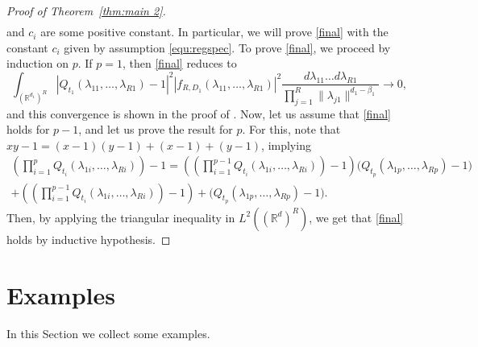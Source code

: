 \documentclass[12pt]{article}
\DeclareMathOperator{\1}{1}
\newcommand{\R}{\mathbb{R}}
\theoremstyle{plain}
\theoremstyle{definition}
\begin{document}
\begin{proof}[Proof of Theorem~\ref{thm:main 2}]
\begin{eqnarray*}
 \end{eqnarray*}
 and $c_i$ are some positive constant.
 In particular, we will prove \eqref{final} with the constant $c_i$ given by assumption \eqref{equ:regspec}.
 To prove \eqref{final}, we proceed by induction on $p$. If $p=1$, then  \eqref{final} reduces to
 \[
\int_{(\R^{d_1})^R}\left|Q_{t_1}(\lambda_{11},\dots,\lambda_{R1})-1\right|^2\left|f_{R,D_1}(\lambda_{11},\dots,\lambda_{R1})\right|^2 \frac{d\lambda_{11}\dots d\lambda_{R1}}{\prod_{j=1}^R\|\lambda_{j1}\|^{d_1-\beta_1}}\rightarrow 0,
 \]
and this convergence is shown in the proof of \cite[Theorem 5]{LO14}. Now, let us assume that \eqref{final} holds for $p-1$, and let us prove the result for $p$. For this, note that $xy-1=(x-1)(y-1)+(x-1)+(y-1)$, implying
\begin{multline}
    \left(\prod_{i=1}^p Q_{t_i}(\lambda_{1i},\dots,\lambda_{Ri})\right)-1
    = \left(\left(\prod_{i=1}^{p-1} Q_{t_i}(\lambda_{1i},\dots,\lambda_{Ri})\right)-1\right)\Bigg(Q_{t_p}(\lambda_{1p},\dots,\lambda_{Rp})-1\Bigg)\\
 +\left(\left(\prod_{i=1}^{p-1} Q_{t_i}(\lambda_{1i},\dots,\lambda_{Ri})\right)-1\right)+\Bigg(Q_{t_p}(\lambda_{1p},\dots,\lambda_{Rp})-1\Bigg). 
\end{multline}
 Then, by applying the triangular inequality in $L^2((\R^d)^R)$, we get that \eqref{final} holds by inductive hypothesis.
 \end{proof}



\section{Examples}\label{sec:ex}

In this Section we collect some examples.
\end{document}
